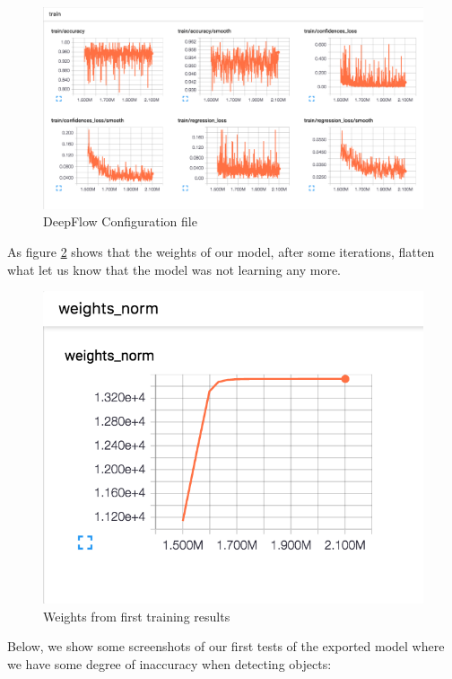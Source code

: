 \begin{figure}[h]
\centering
\includegraphics[scale=0.3]{figures/training_graph_tf.png}
\caption{DeepFlow Configuration file}
\label{training_graph_tf}
\end{figure}

\newpage
As figure \ref{weights_norm} shows that the weights of our model, after some iterations, flatten what let us know that the model was not learning any more.

\begin{figure}[h]
\centering
\includegraphics[scale=0.3]{figures/weights_norm.png}
\caption{Weights from first training results}
\label{weights_norm}
\end{figure}

Below, we show some screenshots of our first tests of the exported model where we have some degree of  inaccuracy when detecting objects:

